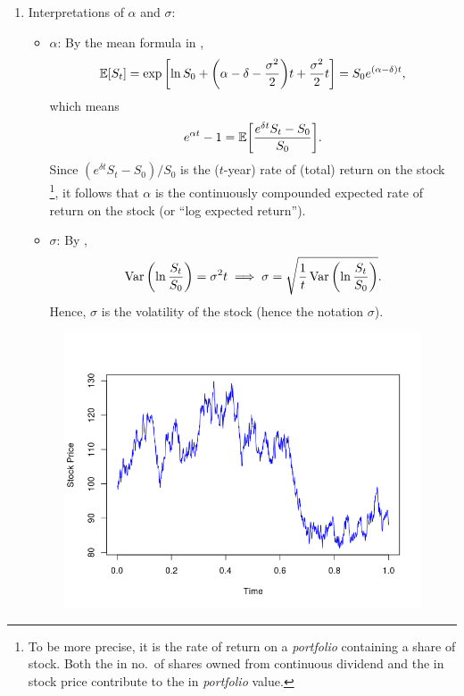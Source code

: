 \begin{enumerate}
\item \label{it:alpha-sigma-interpret}
Interpretations of \(\alpha\) and \(\sigma\):
\begin{itemize}
\item \(\alpha\): By the mean formula in ,
\[
\mathbb{E}\qty[S_t]=\exp\qty[\ln S_0+\qty(\alpha-\delta-\frac{\sigma^2}{2})t+\frac{\sigma^2}{2}t]
=S_0e^{(\alpha-\delta)t},
\]
which means
\[
e^{\alpha t}-1=\mathbb{E}\qty[\frac{e^{\delta t}S_t-S_0}{S_0}].
\]
Since \((e^{\delta t}S_t-S_0)/S_0\) is the (\(t\)-year) rate of (total) return
on the stock \footnote{To be more precise, it is the rate of
return on a \emph{portfolio} containing a share of stock. Both the
 in no.\ of shares owned from continuous dividend and the
 in stock price contribute to the  in
\emph{portfolio} value.}, it follows that \(\alpha\) is the continuously
compounded expected rate of return on the stock  (or ``log
expected return'').
\item \(\sigma\): By ,
\[
\operatorname{Var}\qty(\ln\frac{S_t}{S_0})=\sigma^2t
\implies
\sigma=\sqrt{\frac{1}{t}\operatorname{Var}\qty(\ln\frac{S_t}{S_0})}.
\]
Hence, \(\sigma\) is the volatility of the stock  (hence the
notation \(\sigma\)).
\end{itemize}
\begin{figure}[!h]
\includegraphics{images/bs-stock-price}

\end{figure}
\end{enumerate}
